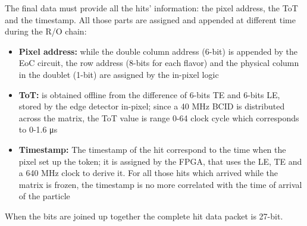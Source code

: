     The final data must provide all the hits' information: the pixel address, the ToT and the timestamp. All those parts are assigned and appended at different time during the R/O chain:  
    \begin{itemize}
        \item\textbf{Pixel address:} while the double column address (6-bit) is appended by the EoC circuit, the row address (8-bits for each flavor) and the physical column in the doublet (1-bit) are assigned by the in-pixel logic      
        \item \textbf{ToT:} is obtained offline from the difference of 6-bits TE and 6-bits LE, stored by the edge detector in-pixel; since a 40 MHz BCID is distributed across the matrix, the ToT value is range 0-64 clock cycle which corresponds to 0-1.6 \si{\us}  
        \item \textbf{Timestamp:} The timestamp of the hit correspond to the time when the pixel set up the token; it is assigned by the FPGA, that uses the LE, TE and a 640 MHz clock to derive it. For all those hits which arrived while the matrix is frozen, the timestamp is no more correlated with the time of arrival of the particle         
    \end{itemize}
    When the bits are joined up together the complete hit data packet is 27-bit. 
